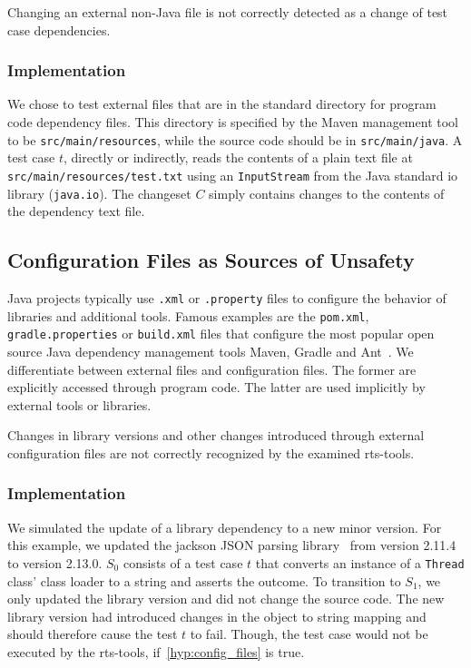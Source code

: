 \begin{hypothesis}\label{hyp:external_files}
    Changing an external non-Java file is not correctly
    detected as a change of test case dependencies.
\end{hypothesis}

\subsubsection{Implementation }
We chose to test external files that are in the standard directory
for program code dependency files. This directory is specified by the Maven management tool to be
\texttt{src/main/resources}, while the source code should be in \texttt{src/main/java}. A test case $t$, directly
or indirectly, reads the contents of a plain text file at
\texttt{src/main/resources/test.txt} using an \texttt{InputStream} from the Java standard io library
(\texttt{java.io}). The changeset $C$ simply contains changes to the contents of the dependency text file.

\subsection{Configuration Files as Sources of Unsafety}\label{ssec:config_files}
Java projects typically use \texttt{.xml} or \texttt{.property} files to configure the behavior of libraries and additional
tools. Famous examples are the \texttt{pom.xml}, \texttt{gradle.properties} or \texttt{build.xml} files that
configure the most popular open source Java dependency management tools Maven, Gradle and Ant~\cite{project_management_tools_report}. We differentiate
between external files and configuration files. The former are explicitly accessed through program
code. The latter are used implicitly by external tools or libraries.

\begin{hypothesis}\label{hyp:config_files}
    Changes in library versions and other changes introduced through external configuration files are
    not correctly recognized by the examined \ac{rts}-tools.
\end{hypothesis}

\subsubsection{Implementation }
We simulated the update of a library dependency to a new minor version. For this example, we updated
the jackson JSON parsing library~\cite{jackson_json_lib} from version 2.11.4 to version 2.13.0. $S_0$ consists of
a test case $t$ that converts an instance of a \texttt{Thread} class' class loader to a string and asserts
the outcome. To transition to $S_1$, we only updated the library version and
did not change the source code. The new library version had introduced changes in the object to string
mapping and should therefore cause the test $t$ to fail. Though, the test case would not be executed by the
\ac{rts}-tools, if~\ref{hyp:config_files} is true.

